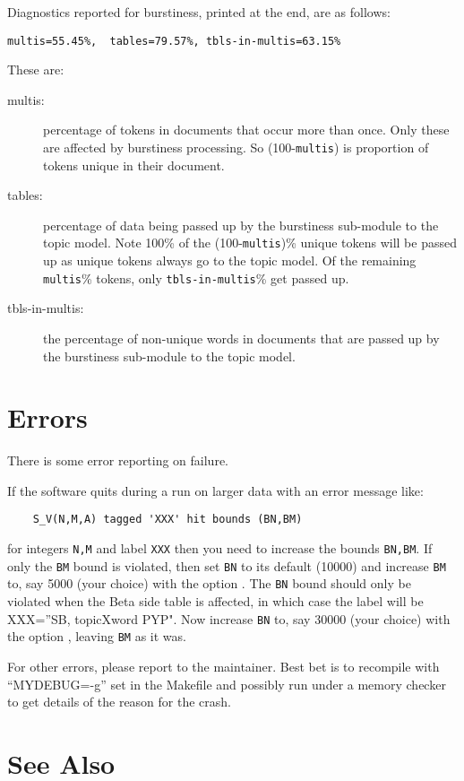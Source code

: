 \documentclass[a4paper,english]{article}
\begin{document}
Diagnostics reported for burstiness, printed at the end, are as follows:
\begin{verbatim}
multis=55.45%,  tables=79.57%, tbls-in-multis=63.15%
\end{verbatim}
These are:
\begin{description}
\item[multis:] percentage of tokens in documents that occur more than
once.  Only these are affected by burstiness processing. 
So (100-\texttt{multis}) is proportion of tokens unique in
their document.  
\item[tables:] percentage of data being passed up by the burstiness
sub-module to the topic model.  
Note 100\% of the  (100-\texttt{multis})\% unique tokens will
be passed up as unique tokens always go to the topic model.
Of the remaining \texttt{multis}\% tokens, only 
\texttt{tbls-in-multis}\% get passed up.
\item[tbls-in-multis:] the percentage of 
non-unique words in documents that are passed up by the burstiness
sub-module to the topic model.  
\end{description}


\section{Errors}

There is some error reporting on failure.

If the software quits during a run on larger data with an
error message like:
\begin{verbatim}
    S_V(N,M,A) tagged 'XXX' hit bounds (BN,BM)
\end{verbatim}
for integers \texttt{N,M} and label \texttt{XXX} then you
need to increase the bounds \texttt{BN,BM}.
If only the \texttt{BM} bound is violated,
then set \texttt{BN} to its default (10000) and increase
\texttt{BM} to, say 5000 (your choice) with the
option .
The \texttt{BN} bound should only be violated
when the Beta side table is affected,
in which case the label will be
XXX=''SB, topicXword PYP".
Now increase \texttt{BN} to, say 30000 (your choice) with the
option ,
leaving \texttt{BM} as it was.

For other errors, please report to the maintainer.
Best bet is to recompile 
with ``MYDEBUG=-g'' set in the Makefile
and possibly run under a memory checker to get details of
the reason for the crash.

\section{See Also}
\end{document}
